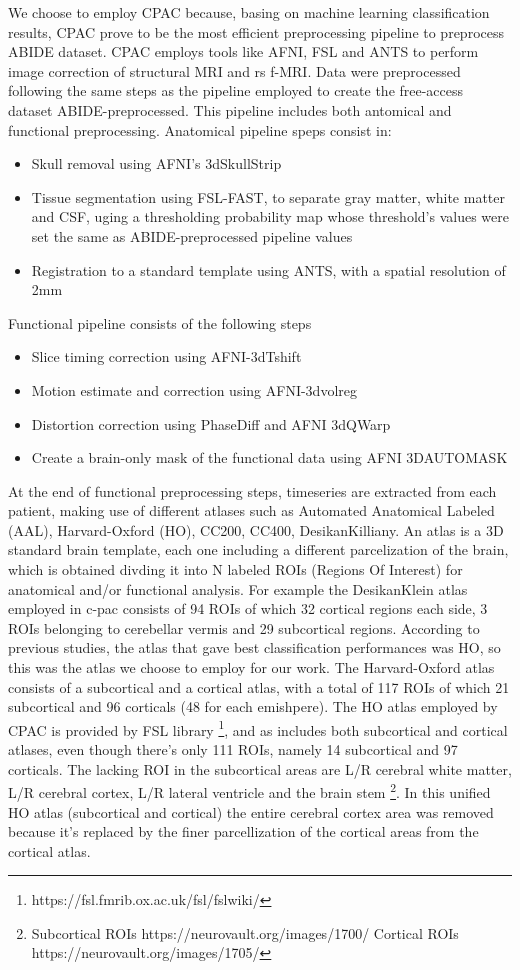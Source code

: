 \documentclass[a4paper,11pt]{article}
\begin{document}
We choose to employ CPAC because, basing on machine learning classification results, \cite{Yang2020} CPAC prove to be the most efficient preprocessing pipeline to preprocess ABIDE dataset.
CPAC employs tools like AFNI, FSL and ANTS to perform image correction of structural MRI and rs f-MRI.
Data were preprocessed following the same steps as the pipeline employed to create the free-access dataset ABIDE-preprocessed.
This pipeline includes both antomical and functional preprocessing.
Anatomical pipeline speps consist in:
\begin{itemize}
\item Skull removal using AFNI's 3dSkullStrip
\item Tissue segmentation using FSL-FAST, to separate gray matter, white matter and CSF, uging a thresholding probability map whose threshold's values were set the same as ABIDE-preprocessed pipeline values
\item Registration to a standard template using ANTS, with a spatial resolution of 2mm
\end{itemize}
Functional pipeline consists of the following steps
\begin{itemize}
\item Slice timing correction using AFNI-3dTshift
\item Motion estimate and correction using AFNI-3dvolreg
\item Distortion correction using PhaseDiff and AFNI 3dQWarp
\item Create a brain-only mask of the functional data using AFNI 3DAUTOMASK
\end{itemize}
At the end of functional preprocessing steps, timeseries are extracted from each patient, making use of different atlases such as Automated Anatomical Labeled (AAL), Harvard-Oxford (HO), CC200, CC400, DesikanKilliany.
An atlas is a 3D standard brain template, each one including a different parcelization of the brain, which is obtained divding it into N labeled ROIs (Regions Of Interest) for anatomical and/or functional analysis.
For example the DesikanKlein atlas employed in c-pac consists of 94 ROIs of which 32 cortical regions each side, 3 ROIs belonging to cerebellar vermis and 29 subcortical regions.
According to previous studies, the atlas that gave best classification performances was HO, so this was the atlas we choose to employ for our work.
The Harvard-Oxford atlas consists of a subcortical and a cortical atlas, with a total of 117 ROIs of which 21 subcortical and 96 corticals (48 for each emishpere).
The HO atlas employed by CPAC is provided by FSL library \footnote{https://fsl.fmrib.ox.ac.uk/fsl/fslwiki/}, and as includes both subcortical and cortical atlases, even though there's only 111 ROIs, namely 14 subcortical and 97 corticals.
The lacking ROI in the subcortical areas are L/R cerebral white matter, L/R cerebral cortex, L/R lateral ventricle and the brain stem \footnote{Subcortical ROIs https://neurovault.org/images/1700/ \quad Cortical ROIs https://neurovault.org/images/1705/ }.
In this unified HO atlas (subcortical and cortical) the entire cerebral cortex area was removed because it's replaced by the finer parcellization of the cortical areas from the cortical atlas.
\end{document}
